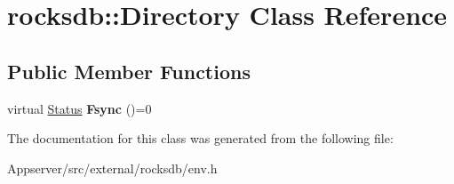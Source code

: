 \hypertarget{classrocksdb_1_1Directory}{}\section{rocksdb\+:\+:Directory Class Reference}
\label{classrocksdb_1_1Directory}
\subsection*{Public Member Functions}
\begin{DoxyCompactItemize}
\item 
virtual \hyperlink{classrocksdb_1_1Status}{Status} {\bfseries Fsync} ()=0\hypertarget{classrocksdb_1_1Directory_a1549af56279af088c832f3b7bcd8ea6e}{}\label{classrocksdb_1_1Directory_a1549af56279af088c832f3b7bcd8ea6e}

\end{DoxyCompactItemize}


The documentation for this class was generated from the following file\+:\begin{DoxyCompactItemize}
\item 
Appserver/src/external/rocksdb/env.\+h\end{DoxyCompactItemize}
